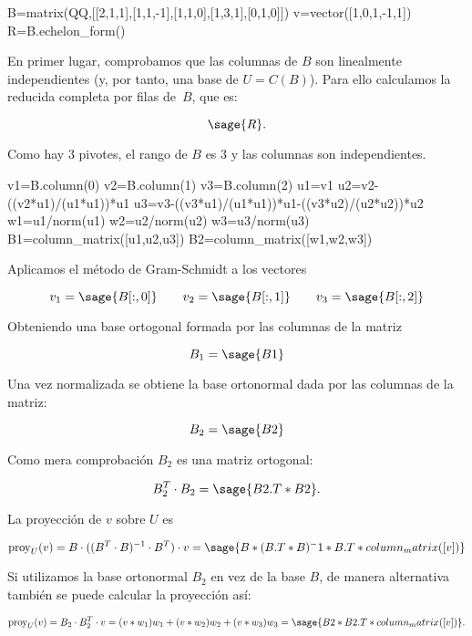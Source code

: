\documentclass{amsart}
\begin{document}
\begin{sageblock}
B=matrix(QQ,[[2,1,1],[1,1,-1],[1,1,0],[1,3,1],[0,1,0]])
v=vector([1,0,1,-1,1])
R=B.echelon_form()
\end{sageblock}

En primer lugar, comprobamos que las columnas de $B$ son linealmente independientes
(y, por tanto, una base de $U=C(B)$). Para ello calculamos la reducida completa por filas de~$B$, que es:

$$ \sage{R}.$$

Como hay $3$ pivotes, el rango de $B$ es $3$ y las columnas son independientes.

\begin{sageblock}
v1=B.column(0)
v2=B.column(1)
v3=B.column(2)
u1=v1
u2=v2-((v2*u1)/(u1*u1))*u1
u3=v3-((v3*u1)/(u1*u1))*u1-((v3*u2)/(u2*u2))*u2
w1=u1/norm(u1)
w2=u2/norm(u2)
w3=u3/norm(u3)
B1=column_matrix([u1,u2,u3])
B2=column_matrix([w1,w2,w3])
\end{sageblock}

Aplicamos el método de Gram-Schmidt a los vectores

$$ v_1=\sage{B[:,0]} \qquad v_2=\sage{B[:,1]} \qquad v_3=\sage{B[:,2]} $$


Obteniendo una base ortogonal formada por las columnas de la matriz

$$ B_1 = \sage{B1} $$
	
Una vez normalizada se obtiene la base ortonormal dada por las columnas de la matriz:

$$ B_2 = \sage{B2} $$

Como mera comprobación $B_2$ es una matriz ortogonal:

$$ B_2^T\cdot B_2 = \sage{B2.T*B2}.$$

La proyección de $v$ sobre $U$ es

$$ {\rm proy}_U(v) = B\cdot ((B^T\cdot B)^{-1}\cdot B^T)\cdot v = \sage{B*(B.T*B)^-1*B.T*column_matrix([v])}$$

Si utilizamos la base ortonormal $B_2$ en vez de la base $B$, de manera alternativa también se puede calcular la proyección así:

$$
	{\rm proy}_U(v) = B_2\cdot B_2^T\cdot v = (v*w_1)w_1+(v*w_2)w_2+(v*w_3)w_3 = \sage{B2*B2.T*column_matrix([v])}.
$$

\end{document}
